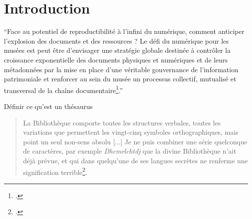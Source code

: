 \chapter{Introduction}	
\enquote{Face au potentiel de reproductibilité à l’infini du numérique, comment anticiper l’explosion des documents et des ressources ? Le défi du numérique pour les musées est peut être d’envisager une stratégie globale destinée à contrôler la croissance exponentielle des documents physiques et numériques et de leurs métadonnées par la mise en place d’une véritable gouvernance de l’information patrimoniale et renforcer au sein du musée un processus collectif, mutualisé et transversal de la chaîne documentaire\footcite{rizzaDocumentAuCoeur2014}.}

Définir ce qu'est un thésaurus
\begin{quote}
    \og La Bibliothèque comporte toutes les structures verbales, toutes les variations que permettent les vingt-cinq symboles orthographiques, mais point un seul non-sens absolu [...] Je ne puis combiner une série quelconque de caractères, par exemple	\textit{Dhcmrlchtdj} que la divine Bibliothèque n’ait déjà prévue, et qui dans quelqu'une de ses langues secrètes ne renferme
	une signification terrible\footcite{borgesBibliothequeBabel1990}.\fg
\end{quote}	
	

	



